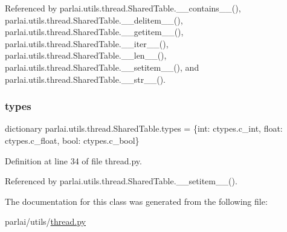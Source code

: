 Referenced by parlai.\+utils.\+thread.\+Shared\+Table.\+\_\+\+\_\+contains\+\_\+\+\_\+(), parlai.\+utils.\+thread.\+Shared\+Table.\+\_\+\+\_\+delitem\+\_\+\+\_\+(), parlai.\+utils.\+thread.\+Shared\+Table.\+\_\+\+\_\+getitem\+\_\+\+\_\+(), parlai.\+utils.\+thread.\+Shared\+Table.\+\_\+\+\_\+iter\+\_\+\+\_\+(), parlai.\+utils.\+thread.\+Shared\+Table.\+\_\+\+\_\+len\+\_\+\+\_\+(), parlai.\+utils.\+thread.\+Shared\+Table.\+\_\+\+\_\+setitem\+\_\+\+\_\+(), and parlai.\+utils.\+thread.\+Shared\+Table.\+\_\+\+\_\+str\+\_\+\+\_\+().

\mbox{\label{classparlai_1_1utils_1_1thread_1_1SharedTable_afe67b490096de733e17e35834a5b55f4}} 
\subsubsection{\texorpdfstring{types}{types}}
{\footnotesize\ttfamily dictionary parlai.\+utils.\+thread.\+Shared\+Table.\+types = \{int\+: ctypes.\+c\+\_\+int, float\+: ctypes.\+c\+\_\+float, bool\+: ctypes.\+c\+\_\+bool\}\hspace{0.3cm}{\ttfamily [static]}}



Definition at line 34 of file thread.\+py.



Referenced by parlai.\+utils.\+thread.\+Shared\+Table.\+\_\+\+\_\+setitem\+\_\+\+\_\+().



The documentation for this class was generated from the following file\+:\begin{DoxyCompactItemize}
\item 
parlai/utils/\hyperlink{thread_8py}{thread.\+py}\end{DoxyCompactItemize}
